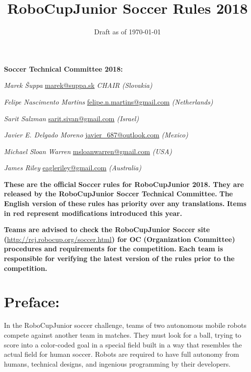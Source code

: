\documentclass{article}
\title{RoboCupJunior Soccer Rules 2018}
\date{Draft as of \today}
\begin{document}
\maketitle

\textbf{Soccer Technical Committee 2018:}

\textit{Marek \v{S}uppa} \underline{marek@suppa.sk} \textit{CHAIR (Slovakia)}

\textit{\textcolor{color-4}{Felipe Nascimento Martins}} \underline{felipe.n.martins@gmail.com} \textit{\textcolor{color-4}{(Netherlands)}}

\textit{\textcolor{color-4}{Sarit Salzman}} \underline{sarit.sivan@gmail.com} \textit{\textcolor{color-4}{(Israel)}}

\textit{\textcolor{color-4}{Javier E. Delgado Moreno}} \underline{javier\_687@outlook.com} \textit{\textcolor{color-4}{(Mexico)}}

\textit{\textcolor{color-4}{Michael Sloan Warren}} \underline{msloanwarren@gmail.com} \textit{\textcolor{color-4}{(USA)}}

\textit{\textcolor{color-4}{James Riley}} \underline{eagleriley@gmail.com} \textit{\textcolor{color-4}{(Australia)}}

\textbf{These are the official} \textbf{Soccer} \textbf{rules for RoboCupJunior 2018. They are released by the RoboCupJunior Soccer Technical Committee.} \textbf{The English version of these} \textbf{rules has priority over any translations.} \textbf{Items in red represent modifications introduced this year.}

\textbf{Teams are advised to check the RoboCupJunior Soccer site (}\underline{\href{http://rcj.robocup.org/soccer.html}{http://rcj.robocup.org/soccer.html}}\textbf{) for OC} \textbf{(Organization Committee)} \textbf{procedures and requirements for the competition.} \textbf{Each team is responsible for verifying the latest version of the rules prior to the competition.}

\section*{Preface:}

In the RoboCupJunior soccer challenge, teams of two autonomous mobile robots compete against another team in matches. They must look for a ball, trying to score into a color-coded goal in a special field built in a way that resembles the actual field for human soccer. Robots are required to have full autonomy from humans, technical designs, and ingenious programming by their developers.
\end{document}
